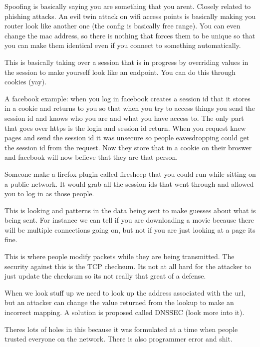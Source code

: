 \documentclass{article}
\begin{document}

Spoofing is basically saying you are something that you arent. Closely related to phishing attacks. An evil twin attack on wifi access points is basically making you router look like another one (the config is basically free range). You can even change the mac address, so there is nothing that forces them to be unique so that you can make them identical even if you connect to something automatically. 


This is basically taking over a session that is in progress by overriding values in the session to make yourself look like an endpoint. You can do this through cookies (yay).

A facebook example: when you log in facebook creates a session id that it stores in a cookie and returns to you so that when you try to access things you send the session id and knows who you are and what you have access to. The only part that goes over https is the login and session id return. When you request knew pages and send the session id it was unsecure so people eavesdropping could get the session id from the request. Now they store that in a cookie on their broswer and facebook will now believe that they are that person.

Someone make a firefox plugin called firesheep that you could run while sitting on a public network. It would grab all the session ids that went through and allowed you to log in as those people.


This is looking and patterns in the data being sent to make guesses about what is being sent. For instance we can tell if you are downloading a movie because there will be multiple connections going on, but not if you are just looking at a page its fine.


This is where people modify packets while they are being transmitted. The security against this is the TCP checksum. Its not at all hard for the attacker to just update the checksum so its not really that great of a defense.


When we look stuff up we need to look up the address associated with the url, but an attacker can change the value returned from the lookup to make an incorrect mapping. A solution is proposed called DNSSEC (look more into it).


Theres lots of holes in this because it was formulated at a time when people trusted everyone on the network. There is also programmer error and shit. 
\end{document}
